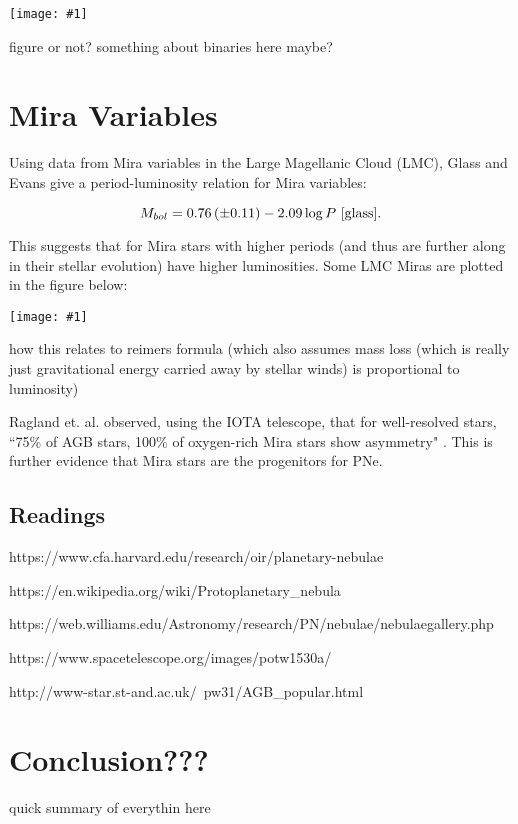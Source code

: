 \documentclass[a4paper,11pt,twocolumn]{article}
\newcommand{\fig}[1]{\centerline{\texttt{[image: \#1]}}}
\begin{document}
\fig{dust_condensation}

{\huge figure or not? something about binaries here maybe?}

\section{Mira Variables}

Using data from Mira variables in the Large Magellanic Cloud (LMC), Glass and Evans give a period-luminosity relation for Mira variables: 

\begin{equation*}
    M_{bol} = 0.76\,(\pm 0.11) - 2.09\log P~\text{\cite{glass}}.
\end{equation*}

This suggests that for Mira stars with higher periods (and thus are further along in their stellar evolution) have higher luminosities. Some LMC Miras are plotted in the figure below:

\vspace{0.2cm}
\fig{period_luminosity}

{\huge how this relates to reimers formula (which also assumes mass loss (which is really just gravitational energy carried away by stellar winds) is proportional to luminosity)}

Ragland et. al. observed, using the IOTA telescope, that for well-resolved stars, ``75\% of AGB stars, 100\% of oxygen-rich Mira stars show asymmetry" \cite{ragland}. This is further evidence that Mira stars are the progenitors for PNe. 

\subsection{Readings}

https://www.cfa.harvard.edu/research/oir/planetary-nebulae


https://en.wikipedia.org/wiki/Protoplanetary_nebula

https://web.williams.edu/Astronomy/research/PN/nebulae/nebulaegallery.php

https://www.spacetelescope.org/images/potw1530a/


http://www-star.st-and.ac.uk/~pw31/AGB_popular.html

\section{Conclusion???}

{\huge quick summary of everythin here}
\end{document}
